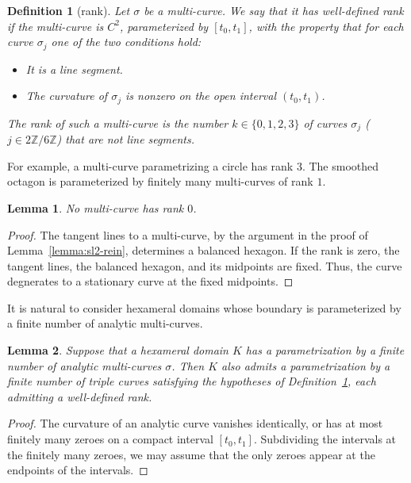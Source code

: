 \documentclass[11pt]{amsart}
\newtheorem{definition}{Definition}
\newtheorem{lemma}{Lemma}
\newcommand{\ring}[1]{\mathbb{#1}}
\def\rZ{{\ring{Z}}}
\begin{document}
\begin{definition}[rank]\label{def:rank}
Let $\sigma$ be a multi-curve.  We say that
it has {\it well-defined rank} if the multi-curve is $C^2$,
parameterized by $[t_0,t_1]$, with
the property that for each curve $\sigma_j$ one of the two conditions
hold:
\begin{itemize}
\item It is a line segment.
\item The curvature of $\sigma_j$
is nonzero on the open interval $(t_0,t_1)$.
\end{itemize}
The {\it rank} of such a multi-curve is the number $k\in\{0,1,2,3\}$ of curves $\sigma_{j}$ ($j\in2\rZ/6\rZ$) 
that
are {\it not} line segments.
\end{definition}
For example, a multi-curve parametrizing a circle
has rank $3$.  The smoothed octagon is parameterized by finitely many
multi-curves of rank $1$.  

\begin{lemma}
No multi-curve has rank $0$.
\end{lemma}

\begin{proof}
The tangent lines to a multi-curve, by the argument in the proof of  Lemma~\ref{lemma:sl2-rein}, determines a balanced hexagon.  If the rank is zero,
the tangent lines, the balanced hexagon, and its midpoints are fixed.
Thus, the curve degnerates to a stationary curve at the fixed midpoints.
\end{proof}

It is natural to consider hexameral domains whose boundary is
parameterized by a finite number of  analytic multi-curves.  

\begin{lemma} Suppose that a hexameral domain $K$ has a parametrization
by  a finite number of analytic multi-curves $\sigma$.
Then $K$ also admits a parametrization by a finite number of triple
curves satisfying the hypotheses of Definition~\ref{def:rank}, each admitting
a well-defined rank.
\end{lemma}

\begin{proof} The curvature of an analytic curve vanishes identically,
or has at most finitely many zeroes on a compact interval $[t_0,t_1]$.
Subdividing the intervals at the finitely many zeroes, we may assume
that the only zeroes appear at the endpoints of the intervals.
\end{proof}
\end{document}
